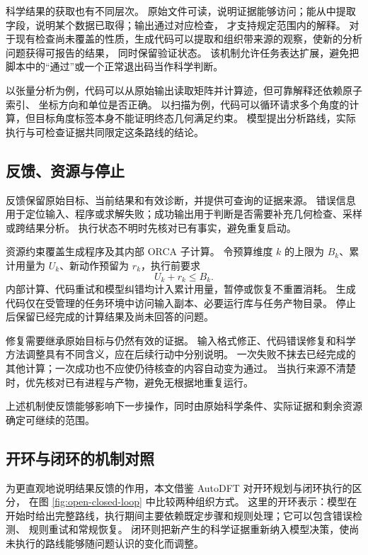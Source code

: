 \documentclass[UTF8,fontset=fandol,a4paper,11pt]{ctexart}
\begin{document}
科学结果的获取也有不同层次。%
原始文件可读，说明证据能够访问；能从中提取字段，说明某个数据已取得；输出通过对应检查，%
才支持规定范围内的解释。%
对于现有检查尚未覆盖的性质，生成代码可以提取和组织带来源的观察，使新的分析问题获得可报告的结果，%
同时保留验证状态。%
该机制允许任务表达扩展，避免把脚本中的“通过”或一个正常退出码当作科学判断。

以张量分析为例，代码可以从原始输出读取矩阵并计算迹，但可靠解释还依赖原子索引、%
坐标方向和单位是否正确。%
以扫描为例，代码可以循环请求多个角度的计算，但目标角度标签本身不能证明终态几何满足约束。%
模型提出分析路线，实际执行与可检查证据共同限定这条路线的结论。

\subsection{反馈、资源与停止}
反馈保留原始目标、当前结果和有效诊断，并提供可查询的证据来源。%
错误信息用于定位输入、程序或求解失败；成功输出用于判断是否需要补充几何检查、采样或跨结果分析。%
执行状态不明时先核对已有事实，避免重复启动。

资源约束覆盖生成程序及其内部 ORCA 子计算。%
令预算维度 $k$ 的上限为 $B_k$、累计用量为 $U_k$、新动作预留为 $r_k$，执行前要求
\begin{equation}
  U_k+r_k\leq B_k.
\end{equation}
内部计算、代码重试和模型纠错均计入累计用量，暂停或恢复不重置消耗。%
生成代码仅在受管理的任务环境中访问输入副本、必要运行库与任务产物目录。%
停止后保留已经完成的计算结果及尚未回答的问题。


修复需要继承原始目标与仍然有效的证据。%
输入格式修正、代码错误修复和科学方法调整具有不同含义，应在后续行动中分别说明。%
一次失败不抹去已经完成的其他计算；一次成功也不应使仍待核查的内容自动变为通过。%
当执行来源不清楚时，优先核对已有进程与产物，避免无根据地重复运行。

上述机制使反馈能够影响下一步操作，同时由原始科学条件、实际证据和剩余资源确定可继续的范围。

\subsection{开环与闭环的机制对照}
为更直观地说明结果反馈的作用，本文借鉴 AutoDFT 对开环规划与闭环执行的区分\cite{autodft}，%
在图 \ref{fig:open-closed-loop} 中比较两种组织方式。%
这里的开环表示：模型在开始时给出完整路线，执行期间主要依赖既定步骤和规则处理；它可以包含错误检测、%
规则重试和常规恢复。%
闭环则把新产生的科学证据重新纳入模型决策，使尚未执行的路线能够随问题认识的变化而调整。
\end{document}
